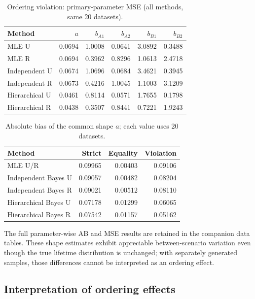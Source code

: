 \documentclass[a4paper,11pt]{article}
\begin{document}
\begin{table}[htbp]\centering\small
\caption{Ordering violation: primary-parameter MSE (all methods, same 20 datasets).}\label{tab:mse-violation}
\begin{tabular}{lrrrrr}\toprule
Method & $a$ & $b_{A1}$ & $b_{A2}$ & $b_{B1}$ & $b_{B2}$\\\midrule
MLE U & 0.0694 & 1.0008 & 0.0641 & 3.0892 & 0.3488\\
MLE R & 0.0694 & 0.3962 & 0.8296 & 1.0613 & 2.4718\\
Independent U & 0.0674 & 1.0696 & 0.0684 & 3.4621 & 0.3945\\
Independent R & 0.0673 & 0.4216 & 1.0045 & 1.1003 & 3.1209\\
Hierarchical U & 0.0461 & 0.8114 & 0.0571 & 1.7655 & 0.1798\\
Hierarchical R & 0.0438 & 0.3507 & 0.8441 & 0.7221 & 1.9243\\
\bottomrule\end{tabular}
\end{table}

\begin{table}[htbp]\centering\small
\caption{Absolute bias of the common shape $a$; each value uses 20 datasets.}\label{tab:shape-ab}
\begin{tabular}{lrrr}\toprule
Method & Strict & Equality & Violation\\\midrule
MLE U/R & 0.09965 & 0.00403 & 0.09106\\
Independent Bayes U & 0.09057 & 0.00482 & 0.08204\\
Independent Bayes R & 0.09021 & 0.00512 & 0.08110\\
Hierarchical Bayes U & 0.07178 & 0.01299 & 0.06065\\
Hierarchical Bayes R & 0.07542 & 0.01157 & 0.05162\\\bottomrule
\end{tabular}\end{table}
The full parameter-wise AB and MSE results are retained in the companion data tables. These shape estimates exhibit appreciable between-scenario variation even though the true lifetime distribution is unchanged; with separately generated samples, those differences cannot be interpreted as an ordering effect.

\subsection{Interpretation of ordering effects}
\end{document}
